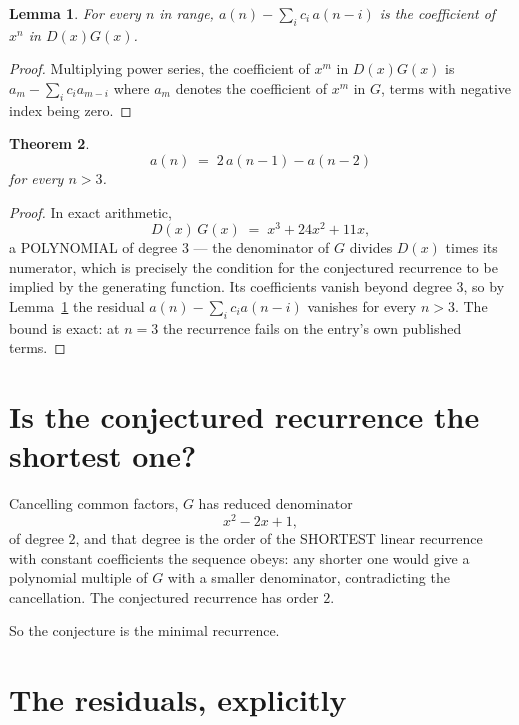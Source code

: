 \documentclass[11pt,a4paper]{article}
\theoremstyle{plain}
\newtheorem{theorem}{Theorem}
\newtheorem{lemma}[theorem]{Lemma}
\theoremstyle{definition}
\begin{document}
\begin{lemma}\label{lem:key}
For every $n$ in range, $a(n)-\sum_i c_i\,a(n-i)$ is the coefficient of $x^{n}$ in
$D(x)G(x)$.
\end{lemma}

\begin{proof}
Multiplying power series, the coefficient of $x^{m}$ in $D(x)G(x)$ is
$a_m-\sum_i c_i a_{m-i}$ where $a_m$ denotes the coefficient of $x^{m}$ in $G$, terms with
negative index being zero.
\end{proof}

\begin{theorem}
\[
a(n)\;=\;2\,a(n-1) - a(n-2)
\]
for every $n>3$.
\end{theorem}

\begin{proof}
In exact arithmetic,
\[
D(x)\,G(x)\;=\;x^{3} + 24 x^{2} + 11 x,
\]
a POLYNOMIAL of degree $3$ --- the denominator of $G$ divides $D(x)$ times its numerator,
which is precisely the condition for the conjectured recurrence to be implied by the
generating function. Its coefficients vanish beyond degree $3$, so by
Lemma~\ref{lem:key} the residual $a(n)-\sum_ic_ia(n-i)$ vanishes for every
$n>3$. The bound is exact: at $n=3$ the recurrence fails on the entry's own published terms.
\end{proof}

\section{Is the conjectured recurrence the shortest one?}

Cancelling common factors, $G$ has reduced denominator
\[
x^{2} - 2 x + 1,
\]
of degree $2$, and that degree is the order of the SHORTEST linear recurrence with
constant coefficients the sequence obeys: any shorter one would give a polynomial multiple of
$G$ with a smaller denominator, contradicting the cancellation. The conjectured recurrence has
order $2$.

So the conjecture is the minimal recurrence.

\section{The residuals, explicitly}
\end{document}
